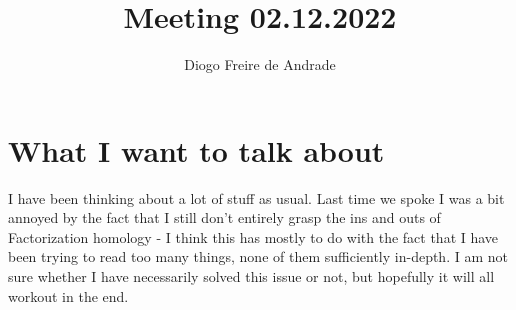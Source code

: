 



\title{Meeting 02.12.2022}
\author{Diogo Freire de Andrade}


\maketitle
\tableofcontents

\section{What I want to talk about}

I have been thinking about a lot of stuff as usual. Last time we spoke I was a bit annoyed by the fact that I still don't entirely grasp the ins and outs of Factorization homology - I think this has mostly to do with the fact that I have been trying to read too many things, none of them sufficiently in-depth. I am not sure whether I have necessarily solved this issue or not, but hopefully it will all workout in the end. 

